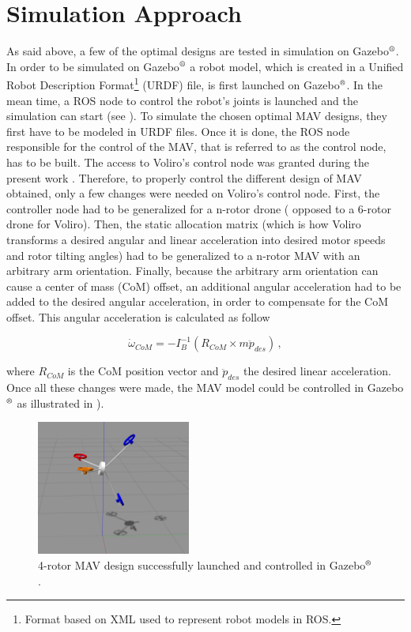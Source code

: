 \section{Simulation Approach}
\label{sec:control_approach}
As said above, a few of the optimal designs are tested in simulation on
Gazebo$^\textrm{\textregistered}$. In order to be simulated on
Gazebo$^\textrm{\textregistered}$ a robot model, which is created
in a Unified Robot Description Format\footnote{Format based on XML used
to represent robot models in ROS.} (URDF) file, is first launched on
Gazebo$^\textrm{\textregistered}$. In the mean time, a ROS node to control
the robot’s joints is launched and the simulation can start
(see ).
To simulate the chosen optimal MAV designs, they first have to be
modeled in URDF files. Once it is done, the ROS node responsible for the
control of the MAV, that is referred to as the control node, has to be built.
The access to Voliro’s control node was granted during the present work
 \citep{kamel_voliro:_2018}. Therefore, to properly control the different
design of MAV obtained, only a few changes were needed on Voliro’s control
node. First, the controller node had to be generalized for a n-rotor drone (
opposed to a 6-rotor drone for Voliro). Then, the static allocation matrix
(which is how Voliro transforms a desired angular and linear acceleration into
desired motor speeds and rotor tilting angles)
had to be generalized to a n-rotor MAV with an arbitrary arm orientation.
Finally, because the arbitrary arm orientation can cause a center of mass (CoM)
offset, an additional angular acceleration had to be added to the desired
angular acceleration, in order to compensate for the CoM offset. This
angular acceleration is calculated as follow

\begin{equation}
  \label{com_offset}
	\dot{\omega}_{CoM} = -I_B^{-1}(R_{CoM}\times m\ddot{p}_{des})\, ,
\end{equation}

where $R_{CoM}$ is the CoM position vector and $\ddot{p}_{des}$ the desired
linear acceleration.\\
Once all these changes were made, the MAV model could be controlled in
Gazebo$^\textrm{\textregistered}$ as illustrated in ).

\begin{figure}[!h]
  \centering
  \includegraphics[width=0.45\textwidth]{images/sim_gazebo.png}
  \caption{4-rotor MAV design successfully launched and controlled in Gazebo$^\textrm{\textregistered}$.}
  \label{fig:sim_gazebo}
\end{figure}
